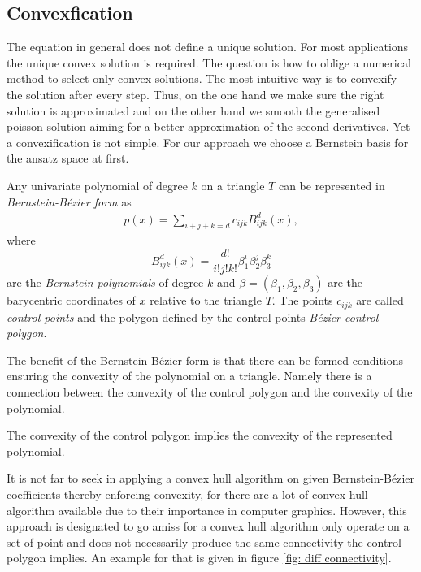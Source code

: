 \subsection{Convexfication}
The \MA equation in general does not define a unique solution. For most applications the unique convex solution is required. The question is how to oblige a numerical method to select only convex solutions.
The most intuitive way is to convexify the solution after every step. Thus, on the one hand we make sure the right solution is approximated and on the other hand we smooth the generalised poisson solution aiming for a better approximation of the second derivatives.
Yet a convexification is not simple. For our approach we choose a Bernstein basis for the ansatz space at first.
\begin{definition}\label{def: BernsteinBezierForm}
	Any univariate polynomial of degree $k$ on a triangle $T$ can be represented in \emph{Bernstein-B\'ezier form} as
\begin{align}
	p(x) = \sum_{i+j+k = d}  c_{ijk} B^d_{ijk}(x),\label{eq: BernsteinBezierForm}
\end{align}
where
\[
	B^d_{ijk}(x) = \frac {d!}{i!j!k!} \beta_1^i \beta_2^j \beta_3^k
\]
are the \emph{Bernstein polynomials} of degree $k$ and $\beta = (\beta_1, \beta_2, \beta_3)$ are the barycentric coordinates of $x$ relative to the triangle $T$.
The points $c_{ijk}$ are called \emph{control points} and the polygon defined by the control points \emph{B\'ezier control polygon}.
\end{definition}

The benefit of the Bernstein-B\'ezier form is that there can be formed conditions ensuring the convexity of the polynomial on a triangle. Namely there is a connection between the convexity of the control polygon and the convexity of the polynomial.
\begin{theorem}
	The convexity of the control polygon implies the convexity of the represented polynomial.
\end{theorem}
It is not far to seek in applying a convex hull algorithm on given Bernstein-B\'ezier coefficients thereby enforcing convexity, for there are a lot of convex hull algorithm available due to their importance in computer graphics. However, this approach is designated to go amiss for a convex hull algorithm only operate on a set of point and does not necessarily produce the same connectivity the control polygon implies. An example for that is given in figure \ref{fig: diff connectivity}. 


